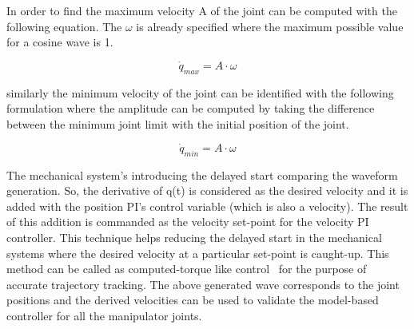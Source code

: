 In order to find the maximum velocity A of the joint can be computed with the following equation. The $\omega$ is already specified where the maximum possible value for a cosine wave is 1.

\begin{equation}
\dot{q}_{max} = A\cdot \omega
\label{eq:maxjointvelocity}
\end{equation}

similarly the minimum velocity of the joint can be identified with the following formulation where the amplitude can be computed by taking the difference between the minimum joint limit with the initial position of the joint.

\begin{equation}
\dot{q}_{min} = A\cdot \omega
\label{eq:minjointvelocity}
\end{equation}

The mechanical system's introducing the delayed start comparing the waveform generation. So, the derivative of q(t) is considered as the desired velocity and it is added with the position PI's control variable (which is also a velocity). The result of this addition is commanded as the velocity set-point for the velocity PI controller. This technique helps reducing the delayed start in the mechanical systems where the desired velocity at a particular set-point is caught-up. This method can be called as computed-torque like control~\cite{Chung2016} for the purpose of accurate trajectory tracking. The above generated wave corresponds to the joint positions and the derived velocities can be used to validate the model-based controller for all the manipulator joints.